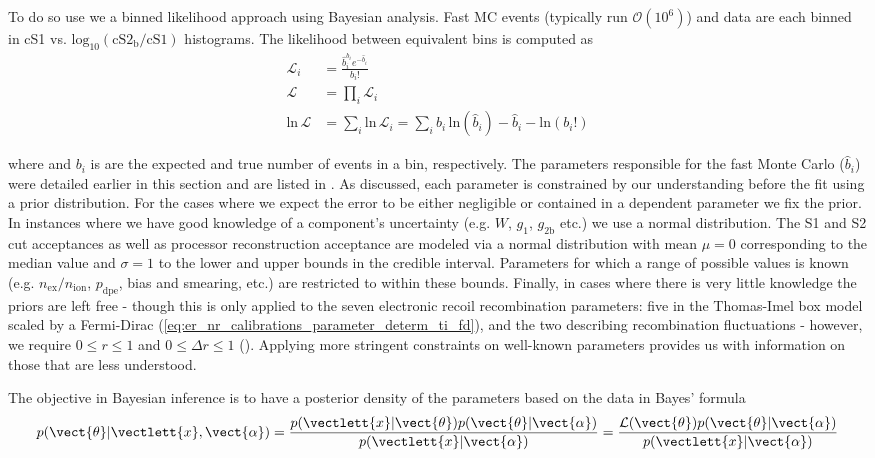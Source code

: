 To do so use we a binned likelihood approach using Bayesian analysis.  Fast MC events (typically run $\mathcal{O}(10^6)$) and data are
each binned in cS1 vs. $\mathrm{log_{10}(cS2_b / cS1)}$ histograms.  The likelihood between equivalent bins \li is computed as
\begin{equation}
\begin{aligned}
\mathcal{L}_i &=\frac{\hat{b}_{i}^{b_i} e^{-\hat{b}_{i}}}{b_{i}!} \\
\mathcal{L} &= \prod_i \mathcal{L}_i \\
\mathrm{ln}\, \mathcal{L} &= \sum_i \mathrm{ln}\, \mathcal{L}_i = \sum_i b_i\, \mathrm{ln} (\hat{b}_i) - \hat{b}_i - \mathrm{ln} (b_i !)
\end{aligned}
\end{equation}

\noindent where \bhi and $b_i$ is are the expected and true number of events in a bin, respectively.  The parameters responsible
for the fast Monte Carlo ($\hat{b}_i$) were detailed earlier in this section and are listed in
.  As discussed, each parameter is constrained by our understanding before
the fit using a prior distribution.  For the cases where we expect the error to be either negligible or contained in a dependent parameter
we fix the prior.  In instances where we have good knowledge of a component's uncertainty (e.g. $W$, $g_1$, $g_{2\mathrm{b}}$ etc.) we use
a normal
distribution.  The S1 and S2 cut acceptances as well as processor reconstruction acceptance are modeled via a normal distribution with
mean $\mu = 0$ corresponding to the median value and $\sigma = 1$ to the lower and upper bounds in the credible interval.  Parameters for
which a range of possible values is known (e.g. $n_{\mathrm{ex}} / n_{\mathrm{ion}}$, $p_{\mathrm{dpe}}$,
bias and smearing, etc.) are restricted to within these bounds.  Finally, in cases where there is very little knowledge the priors
are left free - though this is only applied to the seven electronic recoil recombination parameters: five in the Thomas-Imel box model
scaled by a Fermi-Dirac (\eqref{eq:er_nr_calibrations_parameter_determ_ti_fd}), and the two describing recombination
fluctuations - however, we require $0 \leq r \leq 1$ and $0 \leq \Delta r \leq 1$
().  Applying more stringent constraints on well-known parameters provides us
with information on those that are less understood.

The objective in Bayesian inference is to have a posterior density of the parameters based on the data in Bayes' formula
\begin{equation}
p(\vect{\theta}|\vectlett{x}, \vect{\alpha}) = \frac{p(\vectlett{x}|\vect{\theta})
p(\vect{\theta}|\vect{\alpha})}{p(\vectlett{x}|\vect{\alpha})} = \frac{\mathcal{L}(\vect{\theta})
p(\vect{\theta}|\vect{\alpha})}{p(\vectlett{x}|\vect{\alpha})}
\end{equation}

